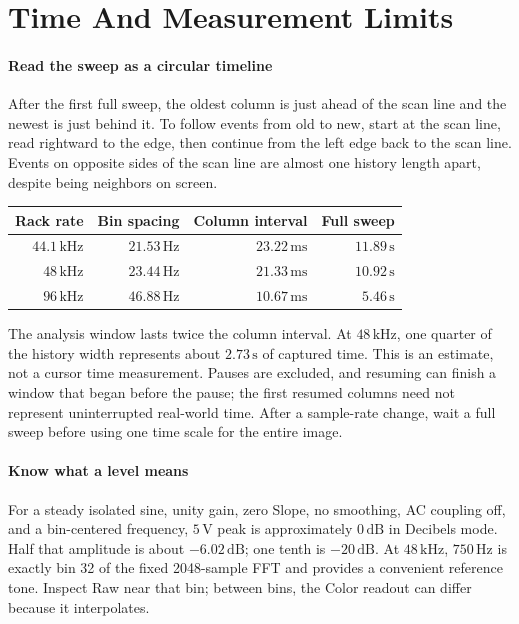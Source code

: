 \section{Time And Measurement Limits}\label{sec:time}

\paragraph{Read the sweep as a circular timeline}
After the first full sweep, the oldest column is just ahead of the scan line
and the newest is just behind it. To follow events from old to new, start at
the scan line, read rightward to the edge, then continue from the left edge
back to the scan line. Events on opposite sides of the scan line are almost
one history length apart, despite being neighbors on screen.

\begin{center}
\renewcommand{\arraystretch}{1.25}
\begin{tabular}{@{}rrrr@{}}
\toprule
\textbf{Rack rate} & \textbf{Bin spacing} & \textbf{Column interval} & \textbf{Full sweep} \\
\midrule
$44.1\,\mathrm{kHz}$ & $21.53\,\mathrm{Hz}$ & $23.22\,\mathrm{ms}$ & $11.89\,\mathrm{s}$ \\
$48\,\mathrm{kHz}$ & $23.44\,\mathrm{Hz}$ & $21.33\,\mathrm{ms}$ & $10.92\,\mathrm{s}$ \\
$96\,\mathrm{kHz}$ & $46.88\,\mathrm{Hz}$ & $10.67\,\mathrm{ms}$ & $5.46\,\mathrm{s}$ \\
\bottomrule
\end{tabular}
\end{center}

The analysis window lasts twice the column interval. At $48\,\mathrm{kHz}$,
one quarter of the history width represents about $2.73\,\mathrm{s}$ of
captured time. This is an estimate, not a cursor time measurement. Pauses are
excluded, and resuming can finish a window that began before the pause; the
first resumed columns need not represent uninterrupted real-world time.
After a sample-rate change, wait a full sweep before using one time scale
for the entire image.

\paragraph{Know what a level means}
For a steady isolated sine, unity gain, zero Slope, no smoothing, AC coupling
off, and a bin-centered frequency, $5\,\mathrm{V}$ peak is approximately
$0\,\mathrm{dB}$ in Decibels mode. Half that amplitude is about
$-6.02\,\mathrm{dB}$; one tenth is $-20\,\mathrm{dB}$. At
$48\,\mathrm{kHz}$, $750\,\mathrm{Hz}$ is exactly bin 32 of the fixed
2048-sample FFT and provides a convenient reference tone. Inspect Raw near
that bin; between bins, the Color readout can differ because it interpolates.

